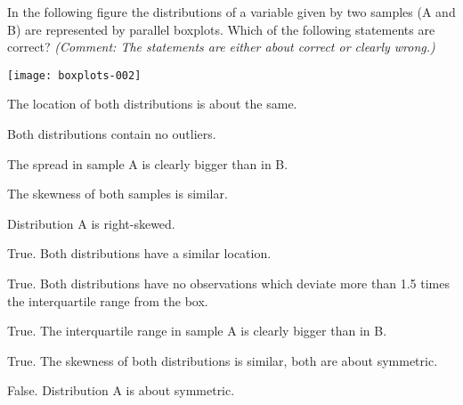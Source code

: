 
\begin{question}
In the following figure the distributions of a variable
given by two samples (A and B) are represented by parallel boxplots.
Which of the following statements are correct?  \emph{(Comment: The
statements are either about correct or clearly wrong.)}

\texttt{[image: boxplots-002]}

\begin{answerlist}
  \item The location of both distributions is about the same.
  \item Both distributions contain no outliers.
  \item The spread in sample A is clearly bigger than in B.
  \item The skewness of both samples is similar.
  \item Distribution A is right-skewed.
\end{answerlist}
\end{question}

\begin{solution}
\begin{answerlist}
  \item True. Both distributions have a similar location.
  \item True. Both distributions have no observations which deviate more than 1.5 times the interquartile range from the box.
  \item True. The interquartile range in sample A is  clearly bigger than in B.
  \item True. The skewness of both distributions is similar, both are about symmetric.
  \item False. Distribution  A  is  about symmetric.
\end{answerlist}
\end{solution}

